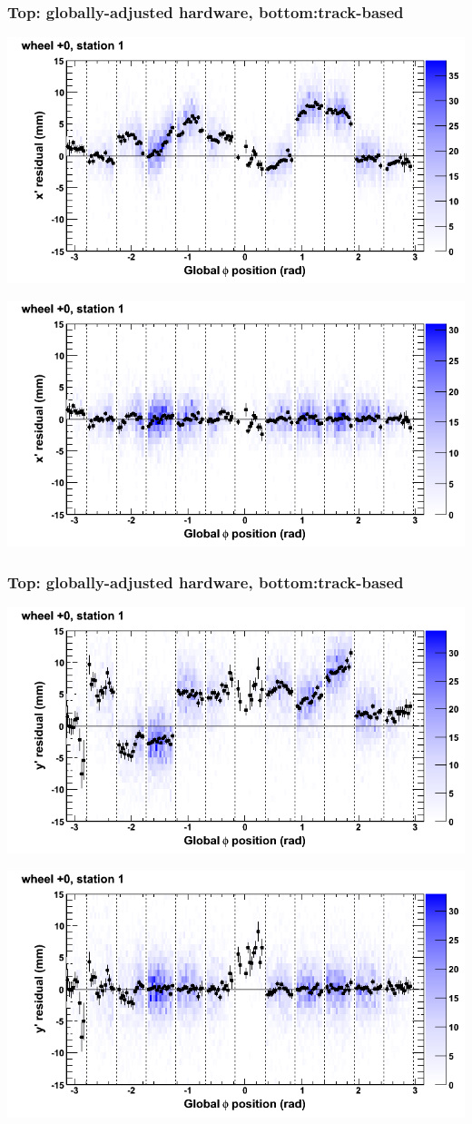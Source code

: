 \documentclass[compress]{beamer}
\begin{document}
\begin{frame}
\frametitle{Top: globally-adjusted hardware, bottom:track-based}
\includegraphics[width=0.7\linewidth]{NOV4_mapplots_HW/DTvsphi_st1whC_x.png}

\includegraphics[width=0.7\linewidth]{NOV4_mapplots/DTvsphi_st1whC_x.png}
\end{frame}

\begin{frame}
\frametitle{Top: globally-adjusted hardware, bottom:track-based}
\includegraphics[width=0.7\linewidth]{NOV4_mapplots_HW/DTvsphi_st1whC_y.png}

\includegraphics[width=0.7\linewidth]{NOV4_mapplots/DTvsphi_st1whC_y.png}
\end{frame}
\end{document}

